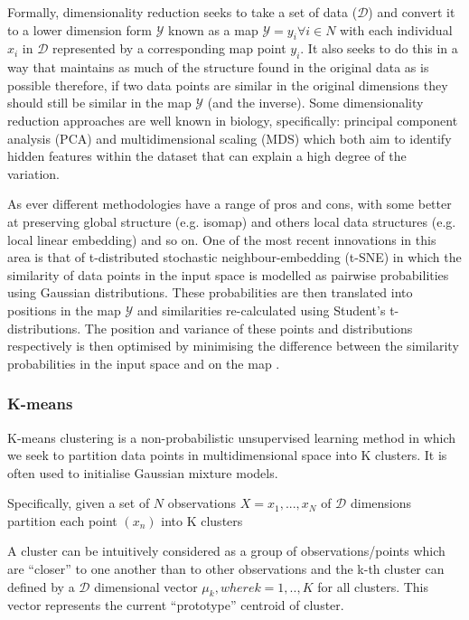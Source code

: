 Formally, dimensionality reduction seeks to take a set of data (\(\mathcal{D}\)) and convert it
to a lower dimension form \(\mathcal{Y}\) known as a map \(\mathcal{Y} = {y_{i} \forall i \in N}\) 
with each individual \(x_{i}\) in \(\mathcal{D}\) represented by a corresponding map point \(y_{i}\). It
also seeks to do this in a way that maintains as much of the structure found in the original data 
as is possible \citep{Maaten2008} therefore, if two data points are similar in the original dimensions
they should still be similar in the map \(\mathcal{Y}\) (and the inverse).
Some dimensionality reduction approaches are well known in biology, specifically: principal component analysis (PCA) 
\citep{hotelling1933analysis} and multidimensional scaling (MDS) \citep{Torgerson1952} which both aim to identify
hidden features within the dataset that can explain a high degree of the variation.  


As ever different methodologies have a range of pros and cons, with
some better at preserving global structure (e.g. isomap) and others local data structures (e.g. local linear embedding) and so on.
One of the most recent innovations in this area is that of t-distributed stochastic neighbour-embedding
(t-SNE) in which the similarity of data points in the input space is modelled as pairwise probabilities 
using Gaussian distributions.
These probabilities are then translated into positions in the map \(\mathcal{Y}\) and similarities re-calculated
using Student's t-distributions.  The position and variance of these points and distributions respectively
is then optimised by minimising the difference between the similarity probabilities in the input space
and on the map \citep{Maaten2008}.

\subsubsection{K-means}

K-means clustering is a non-probabilistic unsupervised learning 
method in which we seek to partition data points in multidimensional space into 
K clusters. It is often used to initialise Gaussian mixture models.

Specifically, given a set of \(N\) observations \(X = {x_{1},...,x_{N}}\) 
of \(\mathcal{D}\) dimensions partition each point \((x_{n})\) into K clusters

A cluster can be intuitively considered as a group of observations/points which are 
``closer'' to one another than to other observations and the k-th cluster can 
defined by a \(\mathcal{D}\) dimensional vector \(\mu_{k}, where k=1,..,K\) for all clusters.
This vector represents the current ``prototype'' centroid of cluster. 

